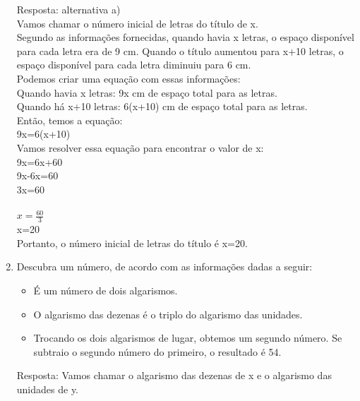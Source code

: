 \documentclass[a4paper,14pt]{article}
\begin{document}
\begin{multicols}{2}
\begin{enumerate}
        Resposta: alternativa a) \\
        
        Vamos chamar o número inicial de letras do título de x.\\
        
        Segundo as informações fornecidas, quando havia x letras, o espaço disponível para cada letra era de 9 cm. Quando o título aumentou para x+10 letras, o espaço disponível para cada letra diminuiu para 6 cm.\\
        
        Podemos criar uma equação com essas informações:\\
        
        Quando havia x letras: 9x cm de espaço total para as letras.\\
        
        Quando há x+10 letras: 6(x+10) cm de espaço total para as letras. \\
        
        Então, temos a equação:\\
         9x=6(x+10)\\
        
        Vamos resolver essa equação para encontrar o valor de x:\\
         
        9x=6x+60 \\
        9x-6x=60 \\
        3x=60 \\ \\
        $x = \frac{60}{3}$\\
        x=20 \\
        
        Portanto, o número inicial de letras do título é x=20.
        \newpage
        
        \item Descubra um número, de acordo com as informações dadas a seguir:
        \begin{itemize}
        	\item É um número de dois algarismos.
        	\item O algarismo das dezenas é o triplo do algarismo das unidades.
        	\item Trocando os dois algarismos de lugar, obtemos um segundo número. Se subtraio o segundo número do primeiro, o resultado é 54.
        \end{itemize}
    
        Resposta: Vamos chamar o algarismo das dezenas de x e o algarismo das unidades de y. \\
        

\end{enumerate}
\end{multicols}
\end{document}
